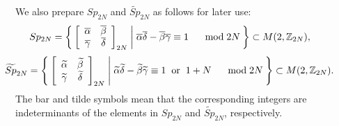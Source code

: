 \documentclass[12pt]{iopart}
\begin{document}
We also prepare \(Sp_{2N}\) and \(\widetilde{Sp}_{2N}\) as follows for later use:
%
\begin{equation}
\hspace{-15mm}
Sp_{2N}
=
\Set{
\left[\begin{array}{cc}
\overline\alpha & \overline\beta \\
\overline\gamma & \overline\delta \\
\end{array}\right]_{2N}
|
\overline\alpha\overline\delta-\overline\beta\overline\gamma\equiv1
\hspace{5mm}\bmod 2N
}
\subset M(2,\mathbb Z_{2N}),
\end{equation}
\begin{equation}
\hspace{-15mm}
\widetilde{Sp}_{2N}
=
\Set{
\left[\begin{array}{cc}
\widetilde\alpha & \widetilde\beta \\
\widetilde\gamma & \widetilde\delta \\
\end{array}\right]_{2N}
|
\widetilde\alpha\widetilde\delta-\widetilde\beta\widetilde\gamma\equiv1\hspace{2mm}{\rm or}\hspace{2mm}{1+N}
\hspace{5mm}\bmod 2N
}
\subset M(2,\mathbb Z_{2N}).
\end{equation}
%
The bar and tilde symbols mean that the corresponding integers are indeterminants of the elements
in \(Sp_{2N}\) and \(\widetilde{Sp}_{2N}\), respectively.
%
%
%
\end{document}
